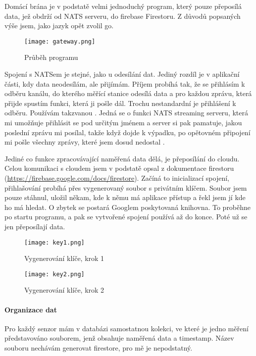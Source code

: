 Domácí brána je v podstatě velmi jednoduchý program, který pouze přeposílá data, jež obdrží od NATS serveru, do 
\gls{firebase} Firestoru. Z důvodů popsaných výše jsem, jako jazyk opět zvolil \gls{go}.

\begin{figure}[H]
    \centering
    \texttt{[image: gateway.png]}
    \caption{Průběh programu}
\end{figure}

Spojení s NATSem je stejné, jako u odesílání dat. Jediný rozdíl je v aplikační části, kdy data neodesílám, ale přijímám. 
Příjem probíhá tak, že se přihlásím k odběru kanálu, do kterého měřící stanice odesílá data a pro každou zprávu, která 
přijde spustím funkci, která ji pošle dál. Trochu nestandardní je přihlášení k odběru. Používám takzvanou . Jedná se o funkci NATS streaming serveru, která mi umožňuje přihlásit se pod určitým jménem a server si 
pak pamatuje, jakou poslední zprávu mi posílal, takže když dojde k výpadku, po opětovném připojení mi pošle všechny 
zprávy, které jsem dosud nedostal \parencite{root.cz:NATS-streaming}.

Jediné co funkce zpracovávající naměřená data dělá, je přeposílání do cloudu. Celou komunikaci s cloudem jsem v podstatě 
opsal z dokumentace firestoru (\url{https://firebase.google.com/docs/firestore}). Začíná to inicializací spojení, 
přihlašování probíhá přes vygenerovaný soubor s privátním klíčem. Soubor jsem pouze stáhnul, uložil někam, kde k němu má 
aplikace přístup a řekl jsem jí kde ho má hledat. O zbytek se postará Googlem poskytovaná \gls{knihovna}. To proběhne po 
startu programu, a pak se vytvořené spojení používá až do konce. Poté už se jen přeposílají data.

\begin{figure}[H]
    \centering
    \texttt{[image: key1.png]}
    \caption{Vygenerování klíče, krok 1}
\end{figure}
\begin{figure}[H]
    \centering
    \texttt{[image: key2.png]}
    \caption{Vygenerování klíče, krok 2}
\end{figure}

\paragraph*{Organizace dat}
Pro každý senzor mám v databázi samostatnou kolekci, ve které je jedno měření představováno souborem, jenž obsahuje 
naměřená data a \gls{timestamp}. Název souboru nechávám generovat firestore, pro mě je nepodstatný.
